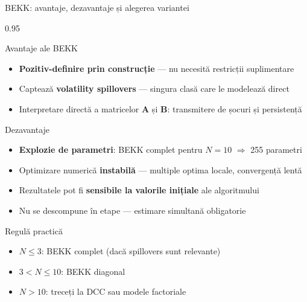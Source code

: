 \documentclass[9pt, aspectratio=169, t]{beamer}
\begin{document}
\begin{frame}{BEKK: avantaje, dezavantaje și alegerea variantei}
    \begin{cminipage}{0.95\textwidth}
    \vspace{-3mm}
    {\scriptsize
    \begin{block}{Avantaje ale BEKK}
        \begin{itemize}\setlength{\itemsep}{0pt}
            \item \textbf{Pozitiv-definire prin construcție} --- nu necesită restricții suplimentare
            \item Captează \textbf{volatility spillovers} --- singura clasă care le modelează direct
            \item Interpretare directă a matricelor $\mathbf{A}$ și $\mathbf{B}$: transmitere de șocuri și persistență
        \end{itemize}
    \end{block}
    \begin{alertblock}{Dezavantaje}
        \begin{itemize}\setlength{\itemsep}{0pt}
            \item \textbf{Explozie de parametri}: BEKK complet pentru $N=10$ $\Rightarrow$ 255 parametri
            \item Optimizare numerică \textbf{instabilă} --- multiple optima locale, convergență lentă
            \item Rezultatele pot fi \textbf{sensibile la valorile inițiale} ale algoritmului
            \item Nu se descompune în etape --- estimare simultană obligatorie
        \end{itemize}
    \end{alertblock}
    \begin{block}{Regulă practică}
        \begin{itemize}\setlength{\itemsep}{0pt}
            \item $N \leq 3$: BEKK complet (dacă spillovers sunt relevante)
            \item $3 < N \leq 10$: BEKK diagonal
            \item $N > 10$: treceți la DCC sau modele factoriale
        \end{itemize}
    \end{block}
    }
    \end{cminipage}
\end{frame}

\end{document}
